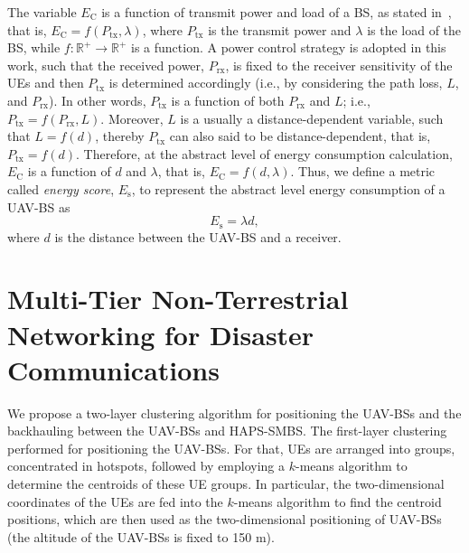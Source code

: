 \documentclass[conference, a4paper]{IEEEtran}
\begin{document}
The variable $E_\text{C}$ is a function of transmit power and load of a BS, as stated in~\cite{UAV_energy}, that is, $E_\text{C} = f(P_\text{tx},\lambda)$, where $P_\text{tx}$ is the transmit power and $\lambda$ is the load of the BS, while $f: \mathbb{R}^+ \rightarrow \mathbb{R}^+$ is a function.
A power control strategy is adopted in this work, such that the received power, $P_\text{rx}$, is fixed to the receiver sensitivity of the UEs and then $P_\text{tx}$ is determined accordingly (i.e., by considering the path loss, $L$, and $P_\text{rx}$). 
In other words, $P_\text{tx}$ is a function of both $P_\text{rx}$ and $L$; i.e., $P_\text{tx}=f(P_\text{rx},L)$.
Moreover, $L$ is a usually a distance-dependent variable, such that $L=f(d)$, thereby $P_\text{tx}$ can also said to be distance-dependent, that is, $P_\text{tx} = f(d)$.
Therefore, at the abstract level of energy consumption calculation, $E_\text{C}$ is a function of $d$ and $\lambda$, that is, $E_\text{C} = f(d,\lambda)$.
Thus, we define a metric called \textit{energy score}, $E_\text{s}$, to represent the abstract level energy consumption of a UAV-BS as
\begin{equation} \label{eq:energy}
    E_\text{s} = \lambda d, 
\end{equation} 
where $d$ is the distance between the UAV-BS and a receiver.

\section{Multi-Tier Non-Terrestrial Networking for Disaster Communications}
We propose a two-layer clustering algorithm for positioning the UAV-BSs and the backhauling between the UAV-BSs and HAPS-SMBS.
The first-layer clustering performed for positioning the UAV-BSs.
For that, UEs are arranged into groups, concentrated in hotspots, followed by employing a $k$-means algorithm to determine the centroids of these UE groups. 
In particular, the two-dimensional coordinates of the UEs are fed into the $k$-means algorithm to find the centroid positions, which are then used as the two-dimensional positioning of UAV-BSs (the altitude of the UAV-BSs is fixed to 150 m).
\end{document}
